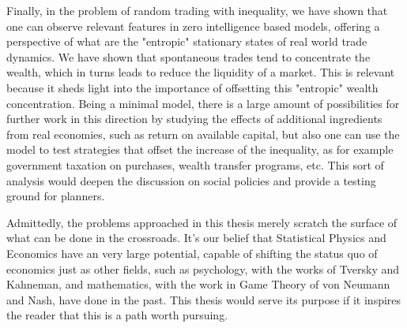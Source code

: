 Finally, in the problem of random trading with inequality, we have shown that one can observe relevant features in zero intelligence based models, offering a perspective of what are the "entropic" stationary states of real world trade dynamics. We have shown that spontaneous trades tend to concentrate the wealth, which in turns leads to reduce the liquidity of a market. This is relevant because it sheds light into the importance of offsetting this "entropic" wealth concentration. Being a minimal model, there is a large amount of possibilities for further work in this direction by studying the effects of additional ingredients from real economies, such as return on available capital, but also one can use the model to test strategies that offset the increase of the inequality, as for example government taxation on purchases, wealth transfer programs, etc. This sort of analysis would deepen the discussion on social policies and provide a testing ground for planners.

Admittedly, the problems approached in this thesis merely scratch the surface of what can be done in the crossroads. It's our belief that Statistical Physics and Economics have an very large potential, capable of shifting the status quo of economics just as other fields, such as psychology, with the works of Tversky and Kahneman, and mathematics, with the work in Game Theory of von Neumann and Nash, have done in the past. This thesis would serve its purpose if it inspires the reader that this is a path worth pursuing.